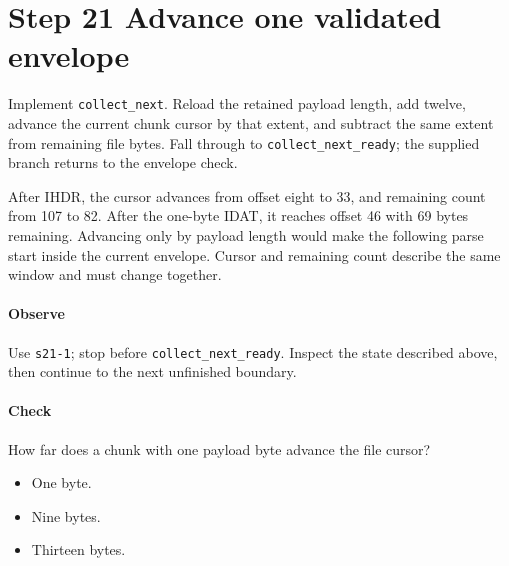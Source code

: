 \section{Step 21 Advance one validated envelope}\label{png-collect-s21}
Implement \texttt{collect\_next}. Reload the retained payload length, add twelve, advance the current chunk cursor by that extent, and subtract the same extent from remaining file bytes. Fall through to \texttt{collect\_next\_ready}; the supplied branch returns to the envelope check.

After IHDR, the cursor advances from offset eight to 33, and remaining count from 107 to 82. After the one-byte IDAT, it reaches offset 46 with 69 bytes remaining. Advancing only by payload length would make the following parse start inside the current envelope. Cursor and remaining count describe the same window and must change together.

\paragraph{Observe} Use \texttt{s21-1}; stop before \texttt{collect\_next\_ready}. Inspect the state described above, then continue to the next unfinished boundary.

\paragraph{Check} How far does a chunk with one payload byte advance the file cursor?
\begin{itemize}
\item[A.] One byte.
\item[B.] Nine bytes.
\item[C.] Thirteen bytes.
\end{itemize}
